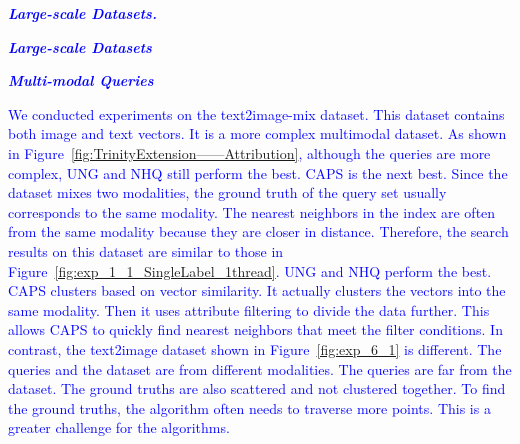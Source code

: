 \documentclass[sigconf, nonacm]{acmart}
\begin{document}
	\textit{\textbf{\textcolor{blue}{Large-scale Datasets.}}} 
	
	\textit{\textbf{\textcolor{blue}{Large-scale Datasets}}} 
	
	\textit{\textbf{\textcolor{blue}{Multi-modal Queries}}} 
	
	
	\textcolor{blue}{
	We conducted experiments on the text2image-mix dataset. This dataset contains both image and text vectors. It is a more complex multimodal dataset. As shown in Figure~\ref{fig:TrinityExtension——Attribution}, although the queries are more complex, UNG and NHQ still perform the best. CAPS is the next best.
	Since the dataset mixes two modalities, the ground truth of the query set usually corresponds to the same modality. The nearest neighbors in the index are often from the same modality because they are closer in distance. Therefore, the search results on this dataset are similar to those in Figure~\ref{fig:exp_1_1_SingleLabel_1thread}. UNG and NHQ perform the best. CAPS clusters based on vector similarity. It actually clusters the vectors into the same modality. Then it uses attribute filtering to divide the data further. This allows CAPS to quickly find nearest neighbors that meet the filter conditions.
	In contrast, the text2image dataset shown in Figure~\ref{fig:exp_6_1} is different. The queries and the dataset are from different modalities. The queries are far from the dataset. The ground truths are also scattered and not clustered together. To find the ground truths, the algorithm often needs to traverse more points. This is a greater challenge for the algorithms.
}
	
\end{document}
